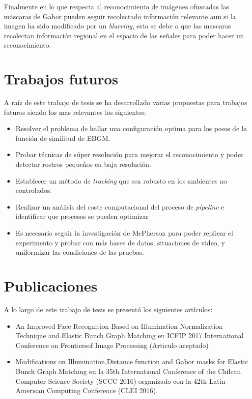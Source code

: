 Finalmente en lo que respecta al reconocimiento de imágenes ofuscadas las máscaras de Gabor pueden seguir recolectado información relevante aun si la imagen ha sido modificado por un \textit{blurring}, esto se debe a que las mascaras recolectan información regional en el espacio de las señales para poder hacer un reconocimiento.

\section{Trabajos futuros}
A raíz de este trabajo de tesis se ha desarrollado varias propuestas para trabajos futuros siendo los mas relevantes los siguientes:
\begin{itemize}
\item Resolver el problema de hallar una configuración optima para los pesos de la función de similitud de \ac{EBGM}.
\item Probar técnicas de súper resolución para mejorar el reconocimiento y poder detectar rostros pequeños en baja resolución.
\item Establecer un método de \textit{tracking} que sea robusto en los ambientes no controlados.
\item Realizar un análisis del coste computacional del proceso de \textit{pipeline} e identificar que procesos se pueden optimizar
\item Es necesario seguir la investigación de McPherson\cite{mcpherson2016defeating} para poder replicar el experimento y probar con más bases de datos, situaciones de video, y uniformizar las condiciones de las pruebas.
\end{itemize}

\section{Publicaciones}
A lo largo de este trabajo de tesis se presentó los siguientes artículos:
\begin{itemize}
\item An Improved Face Recognition Based on Illumination Normalization Technique and Elastic Bunch Graph Matching en ICFIP 2017 International Conference on Frontiersof Image Processing (Articulo aceptado)
\item Modifications on Illumination,Distance function and Gabor masks for Elastic Bunch Graph Matching en la 35th International Conference of the Chilean Computer Science Society (SCCC 2016) organizado con la 42th Latin American Computing Conference (CLEI 2016)\cite{caceres2016modifications}.
\end{itemize}

